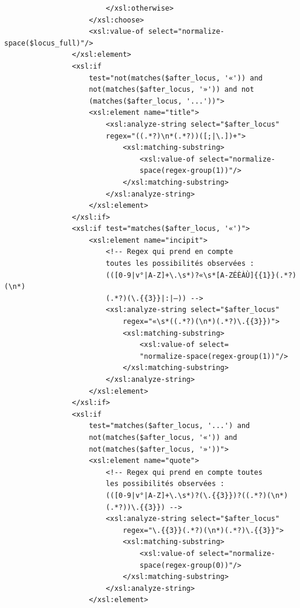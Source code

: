 \documentclass[a4paper,12pt,twoside]{book}
\begin{document}
\begin{verbatim}
                        </xsl:otherwise>
                    </xsl:choose>
                    <xsl:value-of select="normalize-space($locus_full)"/>
                </xsl:element>
                <xsl:if
                    test="not(matches($after_locus, '«')) and 
                    not(matches($after_locus, '»')) and not
                    (matches($after_locus, '...'))">
                    <xsl:element name="title">
                        <xsl:analyze-string select="$after_locus" 
                        regex="((.*?)\n*(.*?))([;|\.])+">
                            <xsl:matching-substring>
                                <xsl:value-of select="normalize-
                                space(regex-group(1))"/>
                            </xsl:matching-substring>
                        </xsl:analyze-string>
                    </xsl:element>
                </xsl:if>
                <xsl:if test="matches($after_locus, '«')">
                    <xsl:element name="incipit">
                        <!-- Regex qui prend en compte 
                        toutes les possibilités observées : 
                        (([0-9|v°|A-Z]+\.\s*)?«\s*[A-ZÉÈÀÙ]{{1}}(.*?)(\n*)
                        (.*?)(\.{{3}}|:|—)) -->
                        <xsl:analyze-string select="$after_locus"
                            regex="«\s*((.*?)(\n*)(.*?)\.{{3}})">
                            <xsl:matching-substring>
                                <xsl:value-of select=
                                "normalize-space(regex-group(1))"/>
                            </xsl:matching-substring>
                        </xsl:analyze-string>
                    </xsl:element>
                </xsl:if>
                <xsl:if
                    test="matches($after_locus, '...') and 
                    not(matches($after_locus, '«')) and 
                    not(matches($after_locus, '»'))">
                    <xsl:element name="quote">
                        <!-- Regex qui prend en compte toutes 
                        les possibilités observées : 
                        (([0-9|v°|A-Z]+\.\s*)?(\.{{3}})?((.*?)(\n*)
                        (.*?))\.{{3}}) -->
                        <xsl:analyze-string select="$after_locus"
                            regex="\.{{3}}(.*?)(\n*)(.*?)\.{{3}}">
                            <xsl:matching-substring>
                                <xsl:value-of select="normalize-
                                space(regex-group(0))"/>
                            </xsl:matching-substring>
                        </xsl:analyze-string>
                    </xsl:element>

\end{verbatim}
\end{document}
